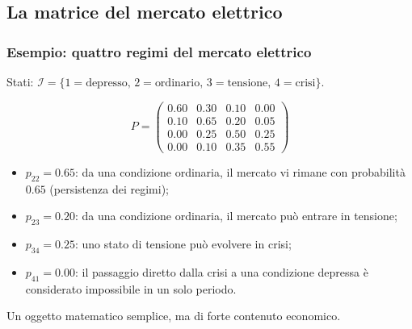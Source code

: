 \documentclass[handout]{beamer}%
\newenvironment{stepitemize}{\begin{itemize}[<+->]}{\end{itemize} }
\providecommand{\QTR}[2]{\csname #1\endcsname{#2}}
\begin{document}


\subsection{La matrice del mercato elettrico}%

\begin{frame}%
%

\frametitle{Esempio: quattro regimi del mercato elettrico}%
%

%


Stati: $\mathcal{I} = \{ 1=\text{depresso}, \, 2=\text{ordinario}, \,
3=\text{tensione}, \, 4=\text{crisi} \}$.%

\[
P=
\begin{pmatrix}
0.60 & 0.30 & 0.10 & 0.00\\
0.10 & 0.65 & 0.20 & 0.05\\
0.00 & 0.25 & 0.50 & 0.25\\
0.00 & 0.10 & 0.35 & 0.55
\end{pmatrix}
\]


\medskip

\begin{stepitemize}
\item $p_{22}=0.65$: da una condizione ordinaria, il mercato vi rimane con
probabilit\`{a} $0.65$ (persistenza dei regimi);

\item $p_{23}=0.20$: da una condizione ordinaria, il mercato pu\`{o} entrare
in tensione;

\item $p_{34}=0.25$: uno stato di tensione pu\`{o} evolvere in crisi;

\item $p_{41}=0.00$: il passaggio diretto dalla crisi a una condizione
depressa \`{e} considerato impossibile in un solo periodo.
\end{stepitemize}

\medskip

\begin{center}
{\small Un oggetto matematico semplice, ma di forte contenuto economico.}
\end{center}%

\transboxout
\end{frame}%
\end{document}
